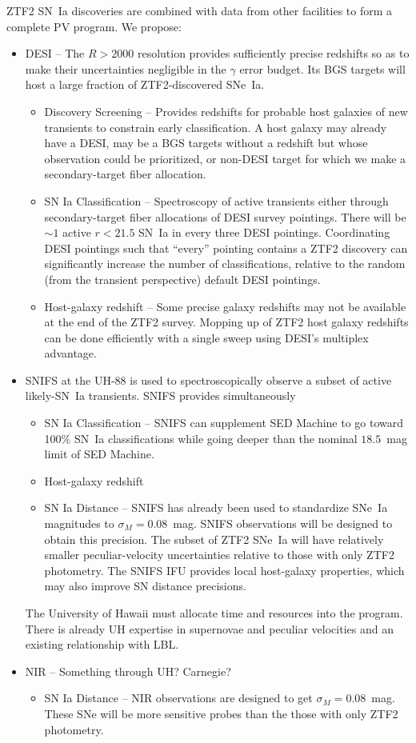 \documentclass[11pt, oneside]{article}   	%
\begin{document}
ZTF2 SN~Ia discoveries are combined with data from other facilities to form a complete PV program.  We propose:
\begin{itemize}
\item DESI --  The $R>2000$ resolution
provides sufficiently precise redshifts so as to make their uncertainties negligible in the $\gamma$ error budget.
Its BGS targets  will host a large fraction of ZTF2-discovered SNe~Ia.
\begin{itemize}
\item Discovery Screening -- Provides redshifts for probable host galaxies of new transients to constrain early classification.  A host galaxy may
already have a DESI, may be a BGS targets without a redshift but whose observation could be prioritized,  or non-DESI target for which we
make a secondary-target fiber allocation.
\item SN Ia Classification -- Spectroscopy of active transients either through secondary-target fiber allocations of DESI survey pointings. There
will be $\sim 1$ active $r<21.5$ SN~Ia in every three DESI pointings.  Coordinating DESI pointings such that ``every'' pointing contains
a  ZTF2 discovery can significantly increase the number of classifications, relative to the random (from the transient perspective) default DESI pointings.
\item Host-galaxy redshift -- Some precise galaxy redshifts may not be available at the end of the ZTF2 survey.  Mopping up of ZTF2 host galaxy redshifts
can be done efficiently with a single sweep using DESI's multiplex advantage.
\end{itemize}
\item SNIFS at the UH-88 is used to spectroscopically observe a subset of active likely-SN~Ia transients.  SNIFS provides simultaneously
\begin{itemize}
\item SN Ia Classification -- SNIFS can supplement SED Machine to go toward 100\% SN~Ia classifications
while going deeper than the nominal $18.5$~mag limit of SED Machine.
\item Host-galaxy redshift
\item SN Ia Distance -- SNIFS has already been used to standardize SNe~Ia magnitudes to $\sigma_M=0.08$~mag.  SNIFS observations will be
designed to obtain this precision.  The subset of ZTF2 SNe~Ia  will have relatively smaller peculiar-velocity uncertainties relative to 
those with only ZTF2 photometry.  The SNIFS IFU provides local host-galaxy properties, which may also improve SN distance precisions.
\end{itemize}
The University of Hawaii must allocate time and resources into the program.  There is already UH expertise in supernovae and peculiar velocities and an existing relationship
with LBL.
\item NIR -- Something through UH?  Carnegie?
\begin{itemize}
\item SN Ia Distance -- NIR observations are designed to get $\sigma_M=0.08$~mag.  These SNe will be more sensitive probes than the
those with only ZTF2 photometry.
\end{itemize}
\end{itemize}
\end{document}
